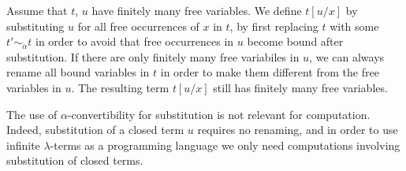 %
%
%
%
%




Assume that $t$, $u$ have finitely many free variables. 
We define $t[u/x]$ by substituting $u$ for all free occurrences of $x$ in $t$, 
by first replacing $t$ with some $t' \sim_\alpha t$
in order to avoid that free occurrences in $u$ become bound after substitution. 
If there are only finitely many free variabiles in $u$, we can always
rename all bound variables in $t$ in order to make them different from the free variables
in $u$. The resulting term $t[u/x]$ still has finitely many free variables.

The use of $\alpha$-convertibility for substitution is not relevant for computation. Indeed,
substitution of a closed term $u$ requires no renaming, and  in order to use 
infinite $\lambda$-terms as a programming language we only need computations 
involving substitution of closed terms. 

